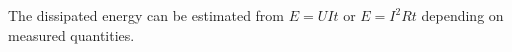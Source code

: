 ﻿\begin{expanswer}
The dissipated energy can be estimated from $E = UIt$ or $E = I^2Rt$ depending on measured quantities.
\end{expanswer}
